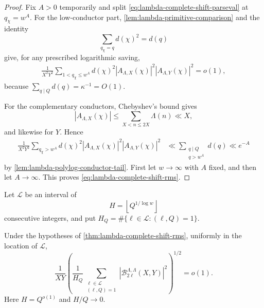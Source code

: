 \begin{proof}
Fix $A>0$ temporarily and split \eqref{eq:lambda-complete-shift-parseval}
at $q_\chi=w^A$.  For the low-conductor part,
\cref{lem:lambda-primitive-comparison} and the identity
\[
 \sum_{q_\chi=q}d(\chi)^2=d(q)
\]
give, for any prescribed logarithmic saving,
\begin{align*}
 \frac1{X^2Y^2}
 \sum_{1<q_\chi\le w^A}
 d(\chi)^2|A_{\Lambda,X}(\chi)|^2
              |A_{\Lambda,Y}(\chi)|^2=o(1),
\end{align*}
because $\sum_{q\mid Q}d(q)=\kappa^{-1}=O(1)$.

For the complementary conductors, Chebyshev's bound gives
\begin{equation}
 |A_{\Lambda,X}(\chi)|\le\sum_{X<n\le2X}\Lambda(n)\ll X,
 \label{eq:lambda-L1-Chebyshev}
\end{equation}
and likewise for $Y$.  Hence
\begin{align*}
 \frac1{X^2Y^2}
 \sum_{q_\chi>w^A}d(\chi)^2
 |A_{\Lambda,X}(\chi)|^2|A_{\Lambda,Y}(\chi)|^2
 &\ll\sum_{\substack{q\mid Q\\q>w^A}}d(q)
 \ll e^{-A}
\end{align*}
by \cref{lem:lambda-polylog-conductor-tail}.  First let $w\to\infty$ with
$A$ fixed, and then let $A\to\infty$.  This proves
\eqref{eq:lambda-complete-shift-rms}.
\end{proof}

Let $\mathcal L$ be an interval of
\begin{equation}
 H=\left\lfloor Q^{1/\log w}\right\rfloor
 \label{eq:lambda-short-shift-length}
\end{equation}
consecutive integers, and put
$H_Q=\#\{\ell\in\mathcal L:(\ell,Q)=1\}$.

\begin{corollary}
\label{cor:lambda-short-shift-rms}
Under the hypotheses of \cref{thm:lambda-complete-shift-rms}, uniformly in
the location of $\mathcal L$,
\begin{equation}
 \frac1{XY}
 \left(
  \frac1{H_Q}
  \sum_{\substack{\ell\in\mathcal L\\(\ell,Q)=1}}
  |\mathcal B_{2\ell}^{\Lambda,\Lambda}(X,Y)|^2
 \right)^{1/2}=o(1).
 \label{eq:lambda-short-shift-rms}
\end{equation}
Here $H=Q^{o(1)}$ and $H/Q\to0$.
\end{corollary}

